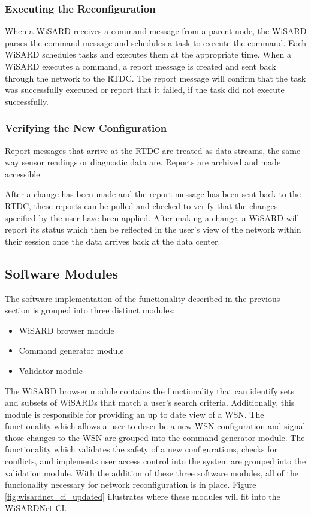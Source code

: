 \subsubsection{Executing the Reconfiguration}
When a WiSARD receives a command message from a parent node, the WiSARD parses the command message and schedules a task to execute the command. Each WiSARD schedules tasks and executes them at the appropriate time. When a WiSARD executes a command, a report message is created and sent back through the network to the RTDC. The report message will confirm that the task was successfully executed or report that it failed, if the task did not execute successfully.

\subsubsection{Verifying the New Configuration}
Report messages that arrive at the RTDC are treated as data streams, the same way sensor readings or diagnostic data are. Reports are archived and made accessible.

After a change has been made and the report message has been sent back to the RTDC, these reports can be pulled and checked to verify that the changes specified by the user have been applied. After making a change, a WiSARD will report its status which then be reflected in the user's view of the network within their session once the data arrives back at the data center.

\subsection{Software Modules}
The software implementation of the functionality described in the previous section is grouped into three distinct modules:

\begin{itemize}
	\item WiSARD browser module
	\item Command generator module
	\item Validator module
\end{itemize}

The WiSARD browser module contains the functionality that can identify sets and subsets of WiSARDs that match a user's search criteria. Additionally, this module is responsible for providing an up to date view of a WSN.  The functionality which allows a user to describe a new WSN configuration and signal those changes to the WSN are grouped into the command generator module. The functionality which validates the safety of a new configurations, checks for conflicts, and implements user access control into the system are grouped into the validation module. With the addition of these three software modules, all of the funcionality necessary for network reconfiguration is in place. Figure \ref{fig:wisardnet_ci_updated} illustrates where these modules will fit into the WiSARDNet CI.\\

